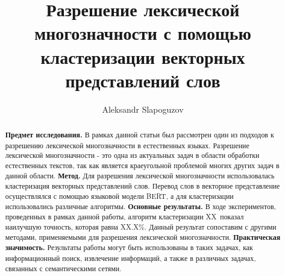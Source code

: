 \documentclass[11pt]{article}
\title{Разрешение лексической многозначности с помощью кластеризации векторных представлений слов}
\author{Aleksandr Slapoguzov}
\begin{document}
    \maketitle
    \begin{abstract}
        \textbf{Предмет исследования.} В рамках данной статьи был рассмотрен один из подходов к разрешению
        лексической многозначности в естественных языках.
        Разрешение лексической многозначности - это одна из актуальных задач в области обработки естественных текстов,
        так как является краеугольной проблемой многих других задач в данной области.
        \textbf{Метод.} Для разрешения лексической многозначности использовалась
        кластеризация векторных представлений слов.
        Перевод слов в векторное представление осуществлялся с помощью языковой модели BERT, а для кластеризации
        использовались различные алгоритмы.
        \textbf{Основные результаты.} В ходе экспериментов, проведенных в рамках данной работы,
        алгоритм кластеризации XX\ показал наилучшую точность, которая равна XX.X\%.
        Данный результат сопоставим с другими методами, применяемыми для разрешения лексической многозначности.
        \textbf{Практическая значимость.} Результаты работы могут быть использованы в таких задачах, как информационный
        поиск, извлечение информаций, а также в различных задачах, связанных с семантическими сетями.
    \end{abstract}
\end{document}
